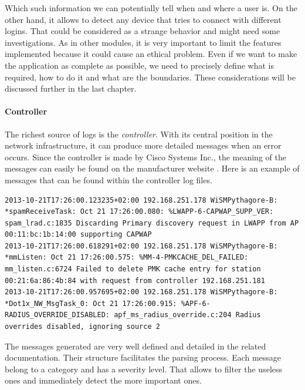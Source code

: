 Which such information we can potentially tell when and where a user is. On the other hand, it allows to detect any device that tries to connect with different logins. That could be considered as a strange behavior and might need some investigations. As in other modules, it is very important to limit the features implemented because it could cause an ethical problem. Even if we want to make the application as complete as possible, we need to precisely define what is required, how to do it and what are the boundaries. These considerations will be discussed further in the last chapter.


\paragraph{Controller}

The richest source of logs is the \emph{controller}. With its central position in the network infrastructure, it can produce more detailed messages when an error occurs. Since the controller is made by Cisco Systems Inc., the meaning of the messages can easily be found on the manufacturer website \cite{syslogCisco}. Here is an example of messages that can be found within the controller log files.

\begin{lstlisting}[frame=single,breaklines=true,caption={Controller logs}]
2013-10-21T17:26:00.123235+02:00 192.168.251.178 WiSMPythagore-B: *spamReceiveTask: Oct 21 17:26:00.080: %LWAPP-6-CAPWAP_SUPP_VER: spam_lrad.c:1835 Discarding Primary discovery request in LWAPP from AP 00:11:bc:1b:14:00 supporting CAPWAP
2013-10-21T17:26:00.618291+02:00 192.168.251.178 WiSMPythagore-B: *mmListen: Oct 21 17:26:00.575: %MM-4-PMKCACHE_DEL_FAILED: mm_listen.c:6724 Failed to delete PMK cache entry for station 00:21:6a:86:4b:84 with request from controller 192.168.251.181
2013-10-21T17:26:00.957695+02:00 192.168.251.178 WiSMPythagore-B: *Dot1x_NW_MsgTask_0: Oct 21 17:26:00.915: %APF-6-RADIUS_OVERRIDE_DISABLED: apf_ms_radius_override.c:204 Radius overrides disabled, ignoring source 2 
\end{lstlisting}

The messages generated are very well defined and detailed in the related documentation. Their structure facilitates the parsing process. Each message belong to a category and has a severity level. That allows to filter the useless ones and immediately detect the more important ones.

